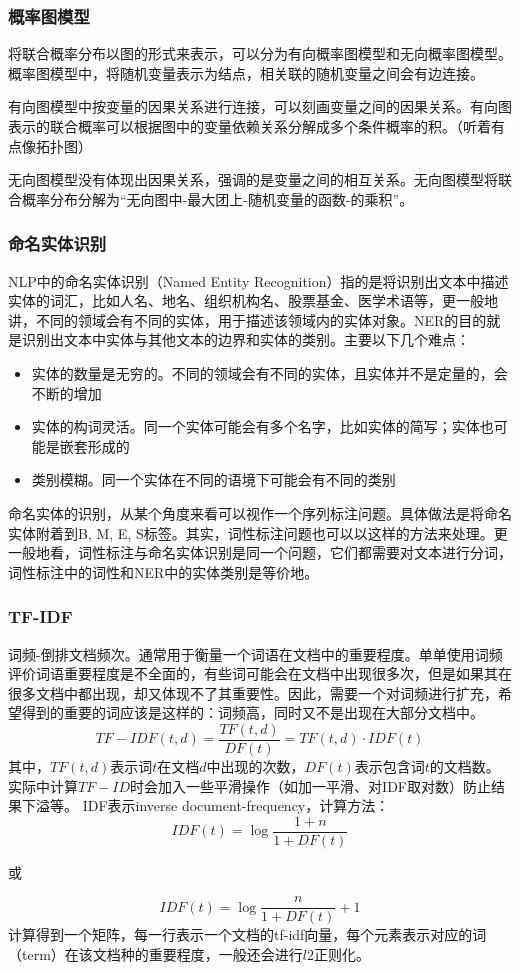 \subsubsection{概率图模型}
将联合概率分布以图的形式来表示，可以分为有向概率图模型和无向概率图模型。
概率图模型中，将随机变量表示为结点，相关联的随机变量之间会有边连接。

有向图模型中按变量的因果关系进行连接，可以刻画变量之间的因果关系。有向图表示的联合概率可以根据图中的变量依赖关系分解成多个条件概率的积。（听着有点像拓扑图）

无向图模型没有体现出因果关系，强调的是变量之间的相互关系。无向图模型将联合概率分布分解为“无向图中-最大团上-随机变量的函数-的乘积”。

\subsubsection{命名实体识别}
NLP中的命名实体识别（Named Entity Recognition）指的是将识别出文本中描述实体的词汇，比如人名、地名、组织机构名、股票基金、医学术语等，更一般地讲，不同的领域会有不同的实体，用于描述该领域内的实体对象。NER的目的就是识别出文本中实体与其他文本的边界和实体的类别。主要以下几个难点：
\begin{itemize}
	\item 实体的数量是无穷的。不同的领域会有不同的实体，且实体并不是定量的，会不断的增加
	\item 实体的构词灵活。同一个实体可能会有多个名字，比如实体的简写；实体也可能是嵌套形成的
	\item 类别模糊。同一个实体在不同的语境下可能会有不同的类别
\end{itemize}

命名实体的识别，从某个角度来看可以视作一个序列标注问题。具体做法是将命名实体附着到{B, M, E, S}标签。其实，词性标注问题也可以以这样的方法来处理。更一般地看，词性标注与命名实体识别是同一个问题，它们都需要对文本进行分词，词性标注中的词性和NER中的实体类别是等价地。

\subsubsection{TF-IDF}
词频-倒排文档频次。通常用于衡量一个词语在文档中的重要程度。单单使用词频评价词语重要程度是不全面的，有些词可能会在文档中出现很多次，但是如果其在很多文档中都出现，却又体现不了其重要性。因此，需要一个对词频进行扩充，希望得到的重要的词应该是这样的：词频高，同时又不是出现在大部分文档中。
$$
TF-IDF(t, d) = \frac{TF(t, d)}{DF(t)} = TF(t, d) \cdot IDF(t)
$$
其中，$TF(t, d)$表示词$t$在文档$d$中出现的次数，$DF(t)$表示包含词$t$的文档数。实际中计算$TF-ID$时会加入一些平滑操作（如加一平滑、对IDF取对数）防止结果下溢等。 IDF表示inverse document-frequency，计算方法：
$$
IDF(t) = \log \frac{1 + n}{1 + DF(t)}
$$
\begin{center}
	或
\end{center}
$$
IDF(t) = \log \frac{n}{1 + DF(t)} + 1
$$
计算得到一个矩阵，每一行表示一个文档的tf-idf向量，每个元素表示对应的词（term）在该文档种的重要程度，一般还会进行$l2$正则化。

